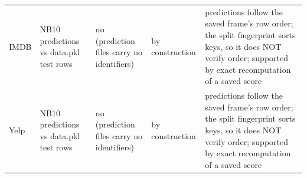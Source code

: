\begin{table}
\begin{tabularx}{\textheight}{l>{\raggedright\arraybackslash}X>{\raggedright\arraybackslash}X>{\raggedright\arraybackslash}X>{\raggedright\arraybackslash}X}
IMDB & NB10 predictions vs data.pkl test rows & no (prediction files carry no identifiers) & by construction & predictions follow the saved frame's row order; the split fingerprint sorts keys, so it does NOT verify order; supported by exact recomputation of a saved score \\
Yelp & NB10 predictions vs data.pkl test rows & no (prediction files carry no identifiers) & by construction & predictions follow the saved frame's row order; the split fingerprint sorts keys, so it does NOT verify order; supported by exact recomputation of a saved score \\
\bottomrule
\end{tabularx}
\par{}
\end{table}
